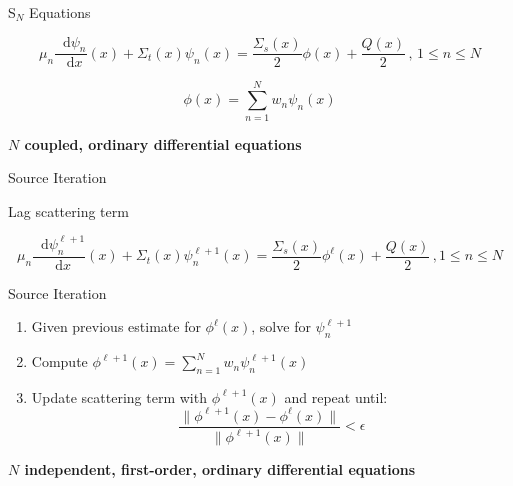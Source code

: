 \documentclass[10pt]{beamer}
\newcommand{\SN}{S$_N$\xspace}
\newcommand{\ud}{\mathop{}\!\mathrm{d}} %
\newcommand{\dderiv}[2]{\frac{\ud #1}{\ud #2}}
\begin{document}
\begin{frame}{\SN Equations}

    \begin{equation*}
        \mu_n \dderiv{\psi_n}{x}(x) + \Sigma_t(x) \psi_n(x) = 
        \frac{\Sigma_s(x)}{2} \phi(x) + \frac{Q(x)}{2} \,, \, 1 \leq n \leq N
    \end{equation*}

    \begin{equation*}
        \phi(x) = \sum_{n=1}^N w_n \psi_n(x)
    \end{equation*}

    \textbf{$N$ coupled, ordinary differential equations}

\end{frame}

\begin{frame}{Source Iteration}

    Lag scattering term 

    \begin{equation*}
        \mu_n \dderiv{\psi_n^{\ell+1}}{x}(x) + \Sigma_t(x) \psi_n^{\ell+1}(x) = 
        \frac{\Sigma_s(x)}{2} \phi^{\ell}(x) + \frac{Q(x)}{2} \,, 1 \leq n \leq N        
    \end{equation*}

    \begin{exampleblock}{Source Iteration}
    \begin{enumerate}
        \item Given previous estimate for $\phi^{\ell}(x)$, solve for $\psi_n^{\ell+1}$

        \item Compute $\phi^{\ell+1}(x) = 
            \sum_{n=1}^N w_n \psi_n^{\ell+1}(x)$ 

        \item Update scattering term with $\phi^{\ell+1}(x)$ and repeat until: 
             \begin{equation*}
                \frac{\|\phi^{\ell+1}(x) - \phi^{\ell}(x)\|}{\|\phi^{\ell+1}(x)\|} < \epsilon 
             \end{equation*}

    \end{enumerate}
    \end{exampleblock}

    \textbf{$N$ independent, first-order, ordinary differential equations}

\end{frame}
\end{document}

